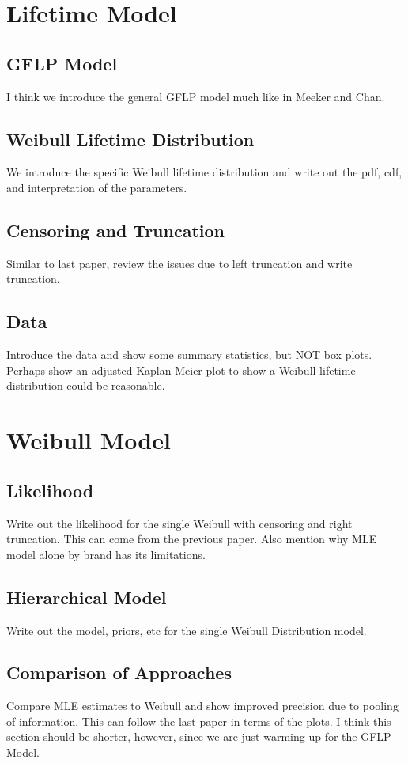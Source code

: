 \documentclass[12pt]{article}
\begin{document}
\section{Lifetime Model}
\subsection{GFLP Model}
I think we introduce the general GFLP model much like in Meeker and Chan.   
\subsection{Weibull Lifetime Distribution}
We introduce the specific Weibull lifetime distribution and write out the pdf, cdf, and interpretation of the parameters. 
\subsection{Censoring and Truncation}
Similar to last paper, review the issues due to left truncation and write truncation.
\subsection{Data}
Introduce the data and show some summary statistics, but NOT box plots.  Perhaps show an adjusted Kaplan Meier plot to show a Weibull lifetime distribution could be reasonable.
     
\section{Weibull Model}
\subsection{Likelihood}
Write out the likelihood for the single Weibull with censoring and right truncation.  This can come from the previous paper.  Also mention why MLE model alone by brand has its limitations.
\subsection{Hierarchical Model}
Write out the model, priors, etc for the single Weibull Distribution model.
\subsection{Comparison of Approaches}
Compare MLE estimates to Weibull and show improved precision due to pooling of information.  This can follow the last paper in terms of the plots.  I think this section should be shorter, however, since we are just warming up for the GFLP Model.
\end{document}
